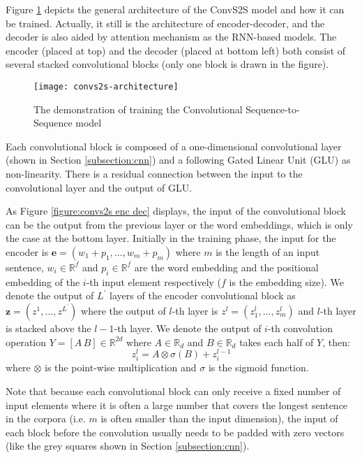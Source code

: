 Figure \ref{figure:convs2s model} depicts the general architecture of the ConvS2S model and how it can be trained. Actually, it still is the architecture of encoder-decoder, and the decoder is also aided by attention mechanism as the RNN-based models. The encoder (placed at top) and the decoder (placed at bottom left) both consist of several stacked convolutional blocks (only one block is drawn in the figure).
\begin{figure}[h]
\texttt{[image: convs2s-architecture]}
\centering
\caption{The demonstration of training the Convolutional Sequence-to-Sequence model \cite{gehring2017convs2s}}
\label{figure:convs2s model}
\end{figure}
Each convolutional block is composed of a one-dimensional convolutional layer (shown in Section \ref{subsection:cnn}) and a following Gated Linear Unit (GLU) as non-linearity. There is a residual connection between the input to the convolutional layer and the output of GLU.


As Figure \ref{figure:convs2s enc dec} displays, the input of the convolutional block can be the output from the previous layer or the word embeddings, which is only the case at the bottom layer. Initially in the training phase, the input for the encoder is $ \textbf{e} = (w_{1}+p_{1},...,w_{m}+p_{m}) $ where $ m $ is the length of an input sentence, $ w_{i} \in \mathbb{R}^{f} $ and $ p_{i} \in \mathbb{R}^{f} $ are the word embedding and the positional embedding of the $ i $-th input element respectively ($ f $ is the embedding size). We denote the output of $ L^{'} $ layers of the encoder convolutional block as $ \textbf{z} = (z^{1},...,z^{L^{'}}) $ where the output of $ l $-th layer is $ z^{l} = (z_{1}^{l},...,z_{m}^{l}) $ and $ l $-th layer is stacked above the $ l-1 $-th layer. We denote the output of $ i $-th convolution operation $ Y = [A\,B] \in \mathbb{R}^{2d} $ where $ A \in \mathbb{R}_{d} $ and $ B \in \mathbb{R}_{d} $ takes each half of $ Y $, then:
\[ z_{i}^{l} = A \otimes \sigma(B) + z_{i}^{l-1} \]
where $ \otimes $ is the point-wise multiplication and $ \sigma $ is the sigmoid function.

Note that because each convolutional block can only receive a fixed number of input elements where it is often a large number that covers the longest sentence in the corpora (i.e. $ m $ is often smaller than the input dimension), the input of each block before the convolution usually needs to be padded with zero vectors (like the grey squares shown in Section \ref{subsection:cnn}).
 
